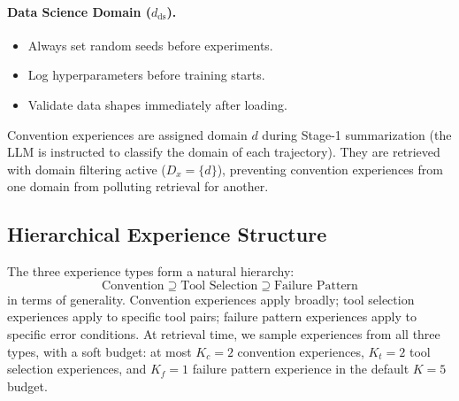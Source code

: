 \paragraph{Data Science Domain ($d_{\text{ds}}$).}
\begin{itemize}[leftmargin=1.5em]
    \item Always set random seeds before experiments.
    \item Log hyperparameters before training starts.
    \item Validate data shapes immediately after loading.
\end{itemize}

Convention experiences are assigned domain $d$ during Stage-1 summarization
(the LLM is instructed to classify the domain of each trajectory). They are
retrieved with domain filtering active ($D_x = \{d\}$), preventing convention
experiences from one domain from polluting retrieval for another.

\subsection{Hierarchical Experience Structure}

The three experience types form a natural hierarchy:
\begin{equation}
    \text{Convention} \supseteq \text{Tool Selection} \supseteq \text{Failure Pattern}
\end{equation}
in terms of generality. Convention experiences apply broadly; tool selection
experiences apply to specific tool pairs; failure pattern experiences apply
to specific error conditions. At retrieval time, we sample experiences from
all three types, with a soft budget: at most $K_c = 2$ convention experiences,
$K_t = 2$ tool selection experiences, and $K_f = 1$ failure pattern experience
in the default $K = 5$ budget.

